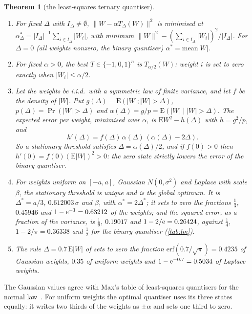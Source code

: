\documentclass[11pt]{article}
\newtheorem{theorem}{Theorem}[section]
\theoremstyle{definition}\newtheorem{definition}[theorem]{Definition}
\theoremstyle{remark}\newtheorem{remark}[theorem]{Remark}
\begin{document}
\begin{theorem}[the least-squares ternary quantiser]\label{prop:lm}
\leavevmode
\begin{enumerate}[label=\textup{(\alph*)}]
\item For fixed $\Delta$ with $I_\Delta\ne\emptyset$, $\|W-\alpha T_\Delta(W)\|^2$ is minimised at $\alpha^*_\Delta=|I_\Delta|^{-1}\sum_{i\in I_\Delta}|W_i|$, with minimum $\|W\|^2-(\sum_{i\in I_\Delta}|W_i|)^2/|I_\Delta|$. For $\Delta=0$ (all weights nonzero, the binary quantiser) $\alpha^*=\mathrm{mean}|W|$.
\item For fixed $\alpha>0$, the best $T\in\{-1,0,1\}^n$ is $T_{\alpha/2}(W)$: weight $i$ is set to zero exactly when $|W_i|\le\alpha/2$.
\item Let the weights be i.i.d.\ with a symmetric law of finite variance, and let $f$ be the density of $|W|$. Put $g(\Delta)=\mathrm E(|W|;|W|>\Delta)$, $p(\Delta)=\Pr(|W|>\Delta)$ and $\alpha(\Delta)=g/p=\mathrm E(|W|\mid|W|>\Delta)$. The expected error per weight, minimised over $\alpha$, is $\mathrm EW^2-h(\Delta)$ with $h=g^2/p$, and
\[
h'(\Delta)=f(\Delta)\,\alpha(\Delta)\,(\alpha(\Delta)-2\Delta).
\]
So a stationary threshold satisfies $\Delta=\alpha(\Delta)/2$, and if $f(0)>0$ then $h'(0)=f(0)(\mathrm E|W|)^2>0$: the zero state strictly lowers the error of the binary quantiser.
\item For weights uniform on $[-a,a]$, Gaussian $N(0,\sigma^2)$ and Laplace with scale $\beta$, the stationary threshold is unique and is the global optimum. It is $\Delta^*=a/3$, $0.612003\,\sigma$ and $\beta$, with $\alpha^*=2\Delta^*$; it sets to zero the fractions $\frac13$, $0.45946$ and $1-\mathrm e^{-1}=0.63212$ of the weights; and the squared error, as a fraction of the variance, is $\frac19$, $0.19017$ and $1-2/\mathrm e=0.26424$, against $\frac14$, $1-2/\pi=0.36338$ and $\frac12$ for the binary quantiser (\cref{tab:lm}).
\item The rule $\Delta=0.7\,\mathrm E|W|$ of \cite{twn2016} sets to zero the fraction $\mathrm{erf}(0.7/\sqrt\pi)=0.4235$ of Gaussian weights, $0.35$ of uniform weights and $1-\mathrm e^{-0.7}=0.5034$ of Laplace weights.
\end{enumerate}
\end{theorem}

The Gaussian values agree with Max's table of least-squares quantisers for the normal law~\cite{max1960}. For uniform weights the optimal quantiser uses its three states equally: it writes two thirds of the weights as $\pm\alpha$ and sets one third to zero.
\end{document}
